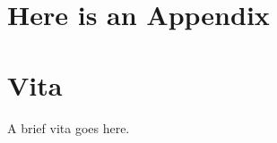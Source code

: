 \documentclass[final]{ukthesis}
\begin{document}
\tableofcontents\clearpage
\listoffigures\clearpage
\listoftables\clearpage


\mainmatter
\OnehalfSpacing


\copyrightnotice


\copyrightnotice


\copyrightnotice



\copyrightnotice


\copyrightnotice


\appendix
\addappheadtotoc
\chapter{Here is an Appendix}

\backmatter

\printbibliography[title={References}]
%
%

\chapter{Vita}
A brief vita goes here.
\end{document}
